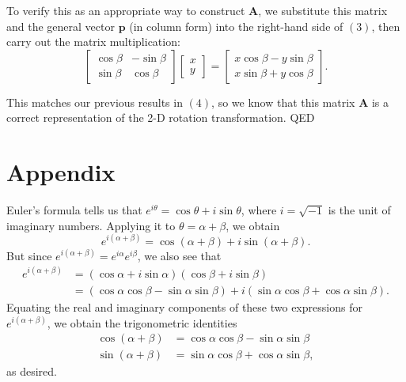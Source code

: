 \documentclass[11pt]{article}
\newcommand{\mat}[1]{\mathbf{#1}}
\renewcommand{\vec}[1]{\mathbf{#1}}
\begin{document}
To verify this as an appropriate way to construct $\mat{A}$, we
substitute this matrix and the general vector $\vec{p}$ (in column
form) into the right-hand side of $(3)$, then carry out the matrix
multiplication:
\begin{equation*}
\begin{bmatrix}
\cos\beta & -\sin\beta \\
\sin\beta & \cos\beta
\end{bmatrix}
\begin{bmatrix}
x \\
y
\end{bmatrix} =
\begin{bmatrix}
x \cos\beta - y \sin\beta \\
x \sin\beta + y \cos\beta
\end{bmatrix}.
\end{equation*}

This matches our previous results in $(4)$, so we know that this
matrix $\mat{A}$ is a correct representation of the 2-D rotation
transformation. QED

\section*{Appendix}
\label{sec-3}

Euler's formula tells us that $e^{i\theta} = \cos\theta +
i\sin\theta$, where $i = \sqrt{-1}$ is the unit of imaginary numbers.
Applying it to $\theta = \alpha + \beta$, we obtain
\begin{equation*}
e^{i(\alpha + \beta)} = \cos(\alpha + \beta) + i\sin(\alpha + \beta).
\end{equation*}
But since $e^{i(\alpha + \beta)} = e^{i\alpha} e^{i\beta}$, we also see that
\begin{align*}
e^{i(\alpha + \beta)} &= (\cos\alpha + i\sin\alpha)(\cos\beta + i\sin\beta) \\
                      &= (\cos\alpha \cos\beta - \sin\alpha \sin\beta) +
                         i(\sin\alpha \cos\beta + \cos\alpha \sin\beta).
\end{align*}
Equating the real and imaginary components of these two expressions
for $e^{i(\alpha + \beta)}$, we obtain the trigonometric identities
\begin{align*}
\cos(\alpha + \beta) &= \cos\alpha \cos\beta - \sin\alpha \sin\beta \\
\sin(\alpha + \beta) &= \sin\alpha \cos\beta + \cos\alpha \sin\beta,
\end{align*}
as desired.
\end{document}
